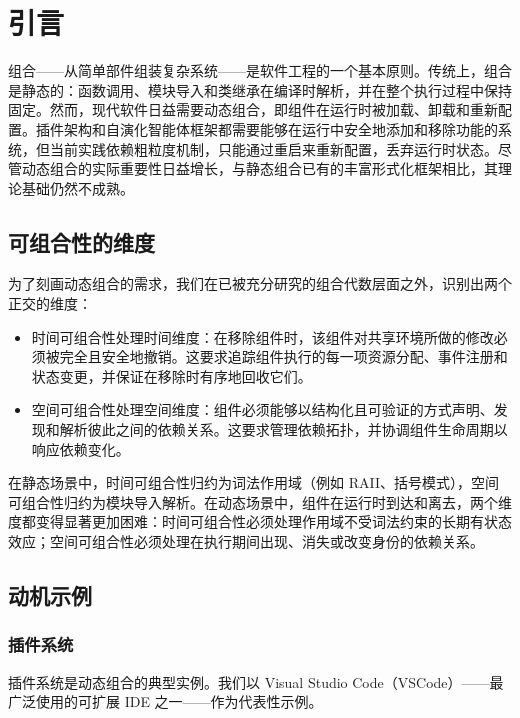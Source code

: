 \section{引言}
\label{sec:1}

组合——从简单部件组装复杂系统——是软件工程的一个基本原则\cite{ref1}。传统上，组合是静态的：函数调用、模块导入和类继承在编译时解析，并在整个执行过程中保持固定。然而，现代软件日益需要动态组合，即组件在运行时被加载、卸载和重新配置。插件架构\cite{ref2}和自演化智能体框架都需要能够在运行中安全地添加和移除功能的系统，但当前实践依赖粗粒度机制\cite{ref3}，只能通过重启来重新配置，丢弃运行时状态。尽管动态组合的实际重要性日益增长，与静态组合已有的丰富形式化框架相比，其理论基础仍然不成熟。

\subsection{可组合性的维度}
\label{sec:1.1}

为了刻画动态组合的需求，我们在已被充分研究的组合代数层面之外，识别出两个正交的维度：

\begin{itemize}
\item 时间可组合性处理时间维度：在移除组件时，该组件对共享环境所做的修改必须被完全且安全地撤销。这要求追踪组件执行的每一项资源分配、事件注册和状态变更，并保证在移除时有序地回收它们。
\item 空间可组合性处理空间维度：组件必须能够以结构化且可验证的方式声明、发现和解析彼此之间的依赖关系。这要求管理依赖拓扑，并协调组件生命周期以响应依赖变化。
\end{itemize}

在静态场景中，时间可组合性归约为词法作用域（例如 RAII\cite{ref4}、括号模式\cite{ref5}），空间可组合性归约为模块导入解析\cite{ref6}。在动态场景中，组件在运行时到达和离去，两个维度都变得显著更加困难：时间可组合性必须处理作用域不受词法约束的长期有状态效应；空间可组合性必须处理在执行期间出现、消失或改变身份的依赖关系。

\subsection{动机示例}
\label{sec:1.2}

\subsubsection{插件系统}
\label{sec:1.2.1}

插件系统是动态组合的典型实例。我们以 Visual Studio Code（VSCode）——最广泛使用的可扩展 IDE 之一——作为代表性示例。

